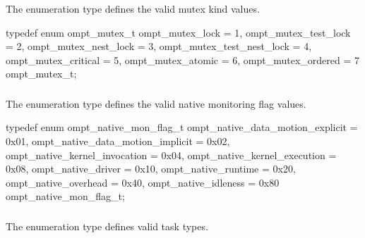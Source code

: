 \subsubsection{}
\label{sec:ompt_mutex_t}

\summary
The  enumeration type defines the valid mutex kind values.

\format
\begin{ccppspecific}
\begin{omptEnum}
typedef enum ompt_mutex_t {
  ompt_mutex_lock                     = 1,
  ompt_mutex_test_lock                = 2,
  ompt_mutex_nest_lock                = 3,
  ompt_mutex_test_nest_lock           = 4,
  ompt_mutex_critical                 = 5,
  ompt_mutex_atomic                   = 6,
  ompt_mutex_ordered                  = 7
} ompt_mutex_t;
\end{omptEnum}
\end{ccppspecific}



\subsubsection{}
\label{sec:ompt_native_mon_flag_t}

\summary
The  enumeration type defines the valid native 
monitoring flag values.

\format
\begin{ccppspecific}
\begin{omptEnum}
typedef enum ompt_native_mon_flag_t {
  ompt_native_data_motion_explicit    = 0x01,
  ompt_native_data_motion_implicit    = 0x02,
  ompt_native_kernel_invocation       = 0x04,
  ompt_native_kernel_execution        = 0x08,
  ompt_native_driver                  = 0x10,
  ompt_native_runtime                 = 0x20,
  ompt_native_overhead                = 0x40,
  ompt_native_idleness                = 0x80
} ompt_native_mon_flag_t;
\end{omptEnum}
\end{ccppspecific}



\subsubsection{}
\label{sec:ompt_task_flag_t}

\summary
The  enumeration type defines valid task types.

